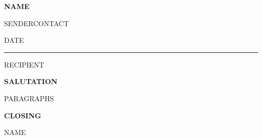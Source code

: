 \documentclass[11pt]{article}
\begin{document}
\noindent
{\LARGE\bfseries\color{ink} {{NAME}}}\par
\vspace{0.1em}
{\small\color{ink} {{SENDERCONTACT}}}\par
\vspace{0.2em}
{\small\color{accent} {{DATE}}}\par
\vspace{0.4em}

\noindent
{\color{accent}\rule{\textwidth}{1.4pt}}\par
\vspace{0.9em}

\noindent
{{RECIPIENT}}

\vspace{1.4em}
\noindent
{\bfseries {{SALUTATION}}}\par

{{PARAGRAPHS}}

\vspace{1.6em}
{\bfseries {{CLOSING}}}\par
\vspace{0.9em}
{\normalsize {{NAME}}}
\end{document}
